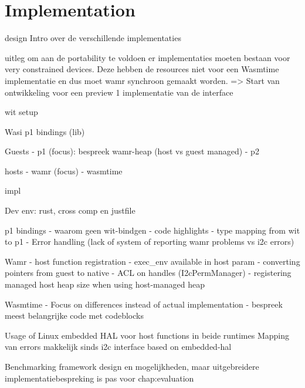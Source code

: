 \chapter{Implementation}
\label{chap:4}


design
Intro over de verschillende implementaties

uitleg om aan de portability te voldoen er implementaties moeten bestaan voor very constrained devices. Deze hebben de resources niet voor een Wasmtime implementatie en dus moet wamr synchroon gemaakt worden.
=> Start van ontwikkeling voor een preview 1 implementatie van de interface

wit setup

Wasi p1 bindings (lib)

Guests
- p1 (focus): bespreek wamr-heap (host vs guest managed)
- p2

hosts
- wamr (focus)
- wasmtime









impl

Dev env: rust, cross comp en justfile

p1 bindings
- waarom geen wit-bindgen
- code highlights
- type mapping from wit to p1
- Error handling (lack of system of reporting wamr problems vs i2c errors)

Wamr
- host function registration
    - exec\_env available in host param
    - converting pointers from guest to native
- ACL on handles (I2cPermManager)
- registering managed host heap size when using host-managed heap

Wasmtime
- Focus on differences instead of actual implementation
- bespreek meest belangrijke code met codeblocks

Usage of Linux embedded HAL voor host functions in beide runtimes
Mapping van errors makkelijk sinds i2c interface based on embedded-hal

Benchmarking framework design en mogelijkheden, maar uitgebreidere implementatiebespreking is pas voor chap:evaluation